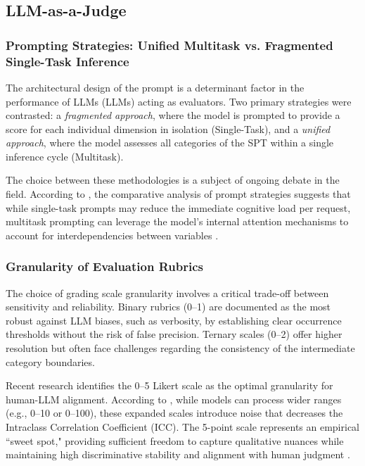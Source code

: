 \subsection{LLM-as-a-Judge}

\subsubsection{Prompting Strategies: Unified Multitask vs. Fragmented Single-Task Inference}

The architectural design of the prompt is a determinant factor in the performance of LLMs (LLMs) acting as evaluators. Two primary strategies were contrasted: a \textit{fragmented approach}, where the model is prompted to provide a score for each individual dimension in isolation (Single-Task), and a \textit{unified approach}, where the model assesses all categories of the SPT within a single inference cycle (Multitask).

The choice between these methodologies is a subject of ongoing debate in the field. According to \cite{Gozzi2024}, the comparative analysis of prompt strategies suggests that while single-task prompts may reduce the immediate cognitive load per request, multitask prompting can leverage the model's internal attention mechanisms to account for interdependencies between variables \cite{Gemini2026}.


\subsubsection{Granularity of Evaluation Rubrics}

The choice of grading scale granularity involves a critical trade-off between sensitivity and reliability. Binary rubrics (0–1) are documented as the most robust against LLM biases, such as verbosity, by establishing clear occurrence thresholds without the risk of false precision. Ternary scales (0–2) offer higher resolution but often face challenges regarding the consistency of the intermediate category boundaries.

Recent research identifies the 0–5 Likert scale as the optimal granularity for human-LLM alignment. According to \cite{Li2026}, while models can process wider ranges (e.g., 0–10 or 0–100), these expanded scales introduce noise that decreases the Intraclass Correlation Coefficient (ICC). The 5-point scale represents an empirical ``sweet spot," providing sufficient freedom to capture qualitative nuances while maintaining high discriminative stability and alignment with human judgment \cite{Li2026}.


